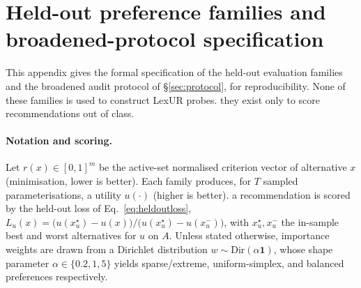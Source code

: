 \section{Held-out preference families and broadened-protocol specification}
\label{app:families}

This appendix gives the formal specification of the held-out evaluation families
and the broadened audit protocol of \S\ref{sec:protocol}, for reproducibility.
None of these families is used to construct LexUR probes. they exist only to score
recommendations out of class.

\paragraph{Notation and scoring.}
Let $r(x)\in[0,1]^m$ be the active-set normalised criterion vector of alternative
$x$ (minimisation, lower is better). Each family produces, for $T$ sampled
parameterisations, a utility $u(\cdot)$ (higher is better). a recommendation is
scored by the held-out loss of Eq.~\eqref{eq:heldoutloss},
$L_u(x)=\bigl(u(x^\star_u)-u(x)\bigr)/\bigl(u(x^\star_u)-u(x^-_u)\bigr)$, with
$x^\star_u,x^-_u$ the in-sample best and worst alternatives for $u$ on $A$. Unless
stated otherwise, importance weights are drawn from a Dirichlet distribution
$w\sim\mathrm{Dir}(\alpha\mathbf 1)$, whose shape parameter $\alpha\in\{0.2,1,5\}$
yields sparse/extreme, uniform-simplex, and balanced preferences respectively.

